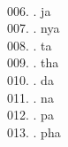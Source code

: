 \begin{tabbing}
\egroup  \\
006.	. 	\> ja 	\> \bgroup\tibetan \def\u#1{\vtop{\baselineskip0pt\hbox{#1}\hbox{\tibsp\char123}}}\parindent=0pt \newbox\fillerbox\setbox\fillerbox\hbox{\vrule height0.4cm depth0.4cm width0pt}\def\filler{\copy\fillerbox}\filler\tibsp{}\tenrm\ \tibetan
\egroup  \\
007.	. 	\> nya 	\> \bgroup\tibetan \def\u#1{\vtop{\baselineskip0pt\hbox{#1}\hbox{\tibsp\char123}}}\parindent=0pt \newbox\fillerbox\setbox\fillerbox\hbox{\vrule height0.4cm depth0.4cm width0pt}\def\filler{\copy\fillerbox}\filler\tibsp{}\tenrm\ \tibetan
\egroup  \\
008.	. 	\> ta 	\> \bgroup\tibetan \def\u#1{\vtop{\baselineskip0pt\hbox{#1}\hbox{\tibsp\char123}}}\parindent=0pt \newbox\fillerbox\setbox\fillerbox\hbox{\vrule height0.4cm depth0.4cm width0pt}\def\filler{\copy\fillerbox}\filler\tibsp{}\tenrm\ \tibetan
\egroup  \\
009.	. 	\> tha 	\> \bgroup\tibetan \def\u#1{\vtop{\baselineskip0pt\hbox{#1}\hbox{\tibsp\char123}}}\parindent=0pt \newbox\fillerbox\setbox\fillerbox\hbox{\vrule height0.4cm depth0.4cm width0pt}\def\filler{\copy\fillerbox}\filler\tibsp{}\tenrm\ \tibetan
\egroup  \\
010.	. 	\> da 	\> \bgroup\tibetan \def\u#1{\vtop{\baselineskip0pt\hbox{#1}\hbox{\tibsp\char123}}}\parindent=0pt \newbox\fillerbox\setbox\fillerbox\hbox{\vrule height0.4cm depth0.4cm width0pt}\def\filler{\copy\fillerbox}\filler\tibsp{}\tenrm\ \tibetan
\egroup  \\
011.	. 	\> na 	\> \bgroup\tibetan \def\u#1{\vtop{\baselineskip0pt\hbox{#1}\hbox{\tibsp\char123}}}\parindent=0pt \newbox\fillerbox\setbox\fillerbox\hbox{\vrule height0.4cm depth0.4cm width0pt}\def\filler{\copy\fillerbox}\filler\tibsp{}\tenrm\ \tibetan
\egroup  \\
012.	. 	\> pa 	\> \bgroup\tibetan \def\u#1{\vtop{\baselineskip0pt\hbox{#1}\hbox{\tibsp\char123}}}\parindent=0pt \newbox\fillerbox\setbox\fillerbox\hbox{\vrule height0.4cm depth0.4cm width0pt}\def\filler{\copy\fillerbox}\filler\tibsp{}\tenrm\ \tibetan
\egroup  \\
013.	. 	\> pha 	\> \bgroup\tibetan \def\u#1{\vtop{\baselineskip0pt\hbox{#1}\hbox{\tibsp\char123}}}\parindent=0pt \newbox\fillerbox\setbox\fillerbox\hbox{\vrule height0.4cm depth0.4cm width0pt}\def\filler{\copy\fillerbox}\filler\tibsp{}\tenrm\ \tibetan

\end{tabbing}
